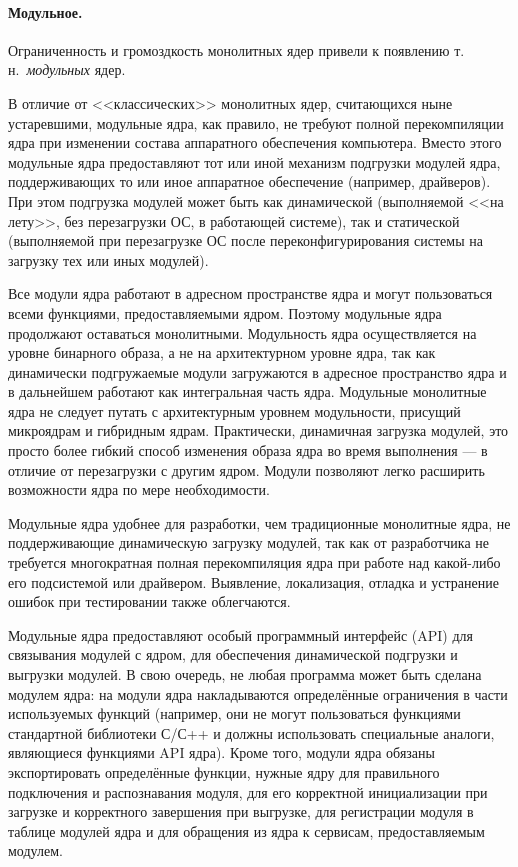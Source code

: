 \paragraph{Модульное.} Ограниченность и громоздкость монолитных ядер привели к появлению т.\,н.~\emph{модульных} ядер.

В отличие от <<классических>> монолитных ядер, считающихся ныне устаревшими, модульные ядра, как правило, не требуют полной перекомпиляции ядра при изменении состава аппаратного обеспечения компьютера. Вместо этого модульные ядра предоставляют тот или иной механизм подгрузки модулей ядра, поддерживающих то или иное аппаратное обеспечение (например, драйверов).
При этом подгрузка модулей может быть как динамической (выполняемой <<на лету>>, без перезагрузки ОС, в работающей системе), так и статической (выполняемой при перезагрузке ОС после переконфигурирования системы на загрузку тех или иных модулей).

Все модули ядра работают в адресном пространстве ядра и могут пользоваться всеми функциями, предоставляемыми ядром. Поэтому модульные ядра продолжают оставаться монолитными. Модульность ядра осуществляется на уровне бинарного образа, а не на архитектурном уровне ядра, так как динамически подгружаемые модули загружаются в адресное пространство ядра и в дальнейшем работают как интегральная часть ядра.
Модульные монолитные ядра не следует путать с архитектурным уровнем модульности, присущий микроядрам и гибридным ядрам. Практически, динамичная загрузка модулей, это просто более гибкий способ изменения образа ядра во время выполнения — в отличие от перезагрузки с другим ядром. Модули позволяют легко расширить возможности ядра по мере необходимости.

Модульные ядра удобнее для разработки, чем традиционные монолитные ядра, не поддерживающие динамическую загрузку модулей, так как от разработчика не требуется многократная полная перекомпиляция ядра при работе над какой-либо его подсистемой или драйвером. Выявление, локализация, отладка и устранение ошибок при тестировании также облегчаются.

Модульные ядра предоставляют особый программный интерфейс (API) для связывания модулей с ядром, для обеспечения динамической подгрузки и выгрузки модулей. В свою очередь, не любая программа может быть сделана модулем ядра: на модули ядра накладываются определённые ограничения в части используемых функций (например, они не могут пользоваться функциями стандартной библиотеки С/С++ и должны использовать специальные аналоги, являющиеся функциями API ядра).
Кроме того, модули ядра обязаны экспортировать определённые функции, нужные ядру для правильного подключения и распознавания модуля, для его корректной инициализации при загрузке и корректного завершения при выгрузке, для регистрации модуля в таблице модулей ядра и для обращения из ядра к сервисам, предоставляемым модулем.

